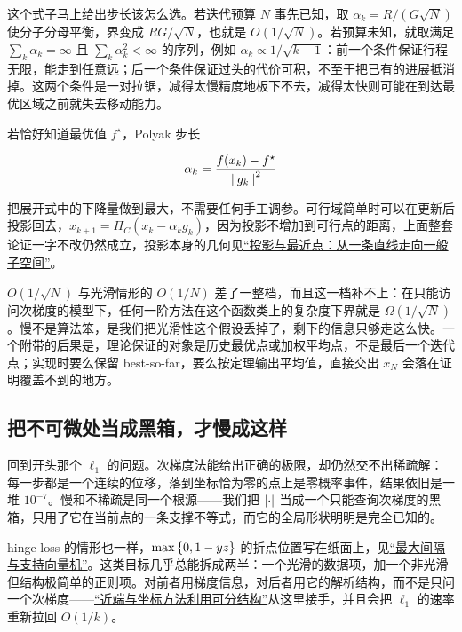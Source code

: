 这个式子马上给出步长该怎么选。若迭代预算 \(N\) 事先已知，取 \(\alpha_k=R/(G\sqrt N)\) 使分子分母平衡，界变成 \(RG/\sqrt N\)，也就是 \(O(1/\sqrt N)\)。若预算未知，就取满足 \(\sum_k\alpha_k=\infty\) 且 \(\sum_k\alpha_k^2<\infty\) 的序列，例如 \(\alpha_k\propto1/\sqrt{k+1}\)：前一个条件保证行程无限，能走到任意远；后一个条件保证过头的代价可积，不至于把已有的进展抵消掉。这两个条件是一对拉锯，减得太慢精度地板下不去，减得太快则可能在到达最优区域之前就失去移动能力。

若恰好知道最优值 \(f^\star\)，Polyak 步长

\[
\alpha_k=\frac{f(x_k)-f^\star}{\left\lVert g_k\right\rVert^2}
\]

把展开式中的下降量做到最大，不需要任何手工调参。可行域简单时可以在更新后投影回去，\(x_{k+1}=\Pi_C(x_k-\alpha_kg_k)\)，因为投影不增加到可行点的距离，上面整套论证一字不改仍然成立，投影本身的几何见\hyperref[sec:03-Linear-Algebra/03-Orthogonality/02]{``投影与最近点：从一条直线走向一般子空间''}。

\(O(1/\sqrt N)\) 与光滑情形的 \(O(1/N)\) 差了一整档，而且这一档补不上：在只能访问次梯度的模型下，任何一阶方法在这个函数类上的复杂度下界就是 \(\Omega(1/\sqrt N)\)。慢不是算法笨，是我们把光滑性这个假设丢掉了，剩下的信息只够走这么快。一个附带的后果是，理论保证的对象是历史最优点或加权平均点，不是最后一个迭代点；实现时要么保留 best-so-far，要么按定理输出平均值，直接交出 \(x_N\) 会落在证明覆盖不到的地方。

\subsection{把不可微处当成黑箱，才慢成这样}

回到开头那个 \(\ell_1\) 的问题。次梯度法能给出正确的极限，却仍然交不出稀疏解：每一步都是一个连续的位移，落到坐标恰为零的点上是零概率事件，结果依旧是一堆 \(10^{-7}\)。慢和不稀疏是同一个根源——我们把 \(\left|\cdot\right|\) 当成一个只能查询次梯度的黑箱，只用了它在当前点的一条支撑不等式，而它的全局形状明明是完全已知的。

hinge loss 的情形也一样，\(\max\left\{0,1-yz\right\}\) 的折点位置写在纸面上，见\hyperref[sec:09-Convex-Optimization/07-Applications/03]{``最大间隔与支持向量机''}。这类目标几乎总能拆成两半：一个光滑的数据项，加一个非光滑但结构极简单的正则项。对前者用梯度信息，对后者用它的解析结构，而不是只问一个次梯度——\hyperref[sec:09-Convex-Optimization/06-Optimization-Algorithms/04]{``近端与坐标方法利用可分结构''}从这里接手，并且会把 \(\ell_1\) 的速率重新拉回 \(O(1/k)\)。
